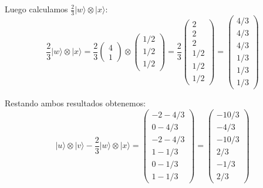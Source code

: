\documentclass[11pt,a4paper]{article}
\begin{document}
Luego calculamos $\frac{2}{3}|w\rangle\otimes|x\rangle$:
$$\frac{2}{3}|w\rangle\otimes|x\rangle = \frac{2}{3} \begin{pmatrix} 4 \\ 1 \end{pmatrix} \otimes \begin{pmatrix} 1/2 \\ 1/2 \\ 1/2 \end{pmatrix} = \frac{2}{3} \begin{pmatrix} 2 \\ 2 \\ 2 \\ 1/2 \\ 1/2 \\ 1/2 \end{pmatrix} = \begin{pmatrix} 4/3 \\ 4/3 \\ 4/3 \\ 1/3 \\ 1/3 \\ 1/3 \end{pmatrix}$$

Restando ambos resultados obtenemos:
$$|u\rangle\otimes|v\rangle - \frac{2}{3} |w\rangle\otimes|x\rangle = \begin{pmatrix} -2 - 4/3 \\ 0 - 4/3 \\ -2 - 4/3 \\ 1 - 1/3 \\ 0 - 1/3 \\ 1 - 1/3 \end{pmatrix} = \begin{pmatrix} -10/3 \\ -4/3 \\ -10/3 \\ 2/3 \\ -1/3 \\ 2/3 \end{pmatrix}$$
\end{document}
